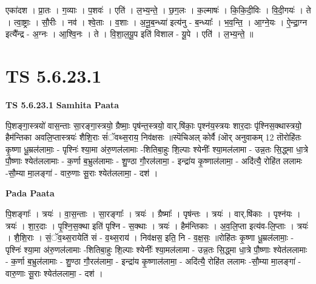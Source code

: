 \documentclass[17pt]{extarticle}
\begin{document}
एका॑दश । प्रा॒तः । ग॒व्याः । प॒शवः॑ । एति॑ । ल॒भ्य॒न्ते॒ । छ॒ग॒लः । क॒ल्माषः॑ । कि॒कि॒दी॒विः । वि॒दी॒गयः॑ । ते । त्वा॒ष्ट्राः । सौ॒रीः । नव॑ । श्वे॒ताः । व॒शाः । अ॒नू॒ब॒न्ध्या॑ इत्य॑नु - ब॒न्ध्याः᳚ । भ॒व॒न्ति॒ । आ॒ग्ने॒यः । ऐ॒न्द्रा॒ग्न इत्यै᳚न्द्र - अ॒ग्नः । आ॒श्वि॒नः । ते । वि॒शा॒ल॒यू॒प इति॑ विशाल - यू॒पे । एति॑ । ल॒भ्य॒न्ते॒ ॥  \newline





\section{ TS 5.6.23.1 }

\textbf{TS 5.6.23.1 } \newline
\textbf{Samhita Paata} \newline

पि॒शङ्गा॒स्त्रयो॑ वास॒न्ताः सा॒रङ्गा॒स्त्रयो॒ ग्रैष्माः॒ पृष॑न्त॒स्त्रयो॒ वार्.षि॑काः॒ पृश्न॑य॒स्त्रयः शार॒दाः पृ॑श्निस॒क्थास्त्रयो॒ हैम॑न्तिका अवलि॒प्तास्त्रयः॑ शैशि॒राः सं॑ॅवथ्स॒राय॒ निव॑क्षसः ॥स्पॆचिअल् कोर्वै fऒर् अनुवाकम् 12 तॊरोहि॑तः कृ॒ष्णा धू॒म्रल॑लामाः॒ - पृश्निः॑ श्या॒मा अ॑रु॒णल॑लामाः -शितिबा॒हुः शि॒ल्पाः श्येनीः᳚ श्या॒मल॑लामा - उन्न॒तः सि॒द्ध्मा धा॒त्रे पौ॒ष्णाः श्येत॑ललामाः - क॒र्णा ब॒भ्रुल॑लामाः - शु॒ण्ठा गौ॒रल॑लामा॒ - इन्द्रा॑य कृ॒ष्णाल॑लामा॒ - अदि॑त्यै॒ रोहि॑त ललामः -सौ॒म्या मा॒लङ्गा॑ - वारु॒णाः सू॒राः श्येत॑ललामा॒ - दश॑ । \newline

\textbf{Pada Paata} \newline

पि॒शङ्गाः᳚ । त्रयः॑ । वा॒स॒न्ताः । सा॒रङ्गाः᳚ । त्रयः॑ । ग्रैष्माः᳚ । पृष॑न्तः । त्रयः॑ । वार्.षि॑काः । पृश्न॑यः । त्रयः॑ । शा॒र॒दाः । पृ॒श्नि॒स॒क्था इति॑ पृश्नि - स॒क्थाः । त्रयः॑ । हैम॑न्तिकाः । अ॒व॒लि॒प्ता इत्य॑व-लि॒प्ताः । त्रयः॑ । शै॒शि॒राः । सं॒ॅव॒थ्स॒रायेति॑ सं - व॒थ्स॒राय॑ । निव॑क्षस॒ इति॒ नि - व॒क्ष॒सः॒ ॥रोहि॑तः कृ॒ष्णा धू॒म्रल॑लामाः॒ - पृश्निः॑ श्या॒मा अ॑रु॒णल॑लामाः -शितिबा॒हुः शि॒ल्पाः श्येनीः᳚ श्या॒मल॑लामा - उन्न॒तः सि॒द्ध्मा धा॒त्रे पौ॒ष्णाः श्येत॑ललामाः - क॒र्णा ब॒भ्रुल॑लामाः - शु॒ण्ठा गौ॒रल॑लामा॒ - इन्द्रा॑य कृ॒ष्णाल॑लामा॒ - अदि॑त्यै॒ रोहि॑त ललामः -सौ॒म्या मा॒लङ्गा॑ - वारु॒णाः सू॒राः श्येत॑ललामा॒ - दश॑ ।  \newline
\end{document}
